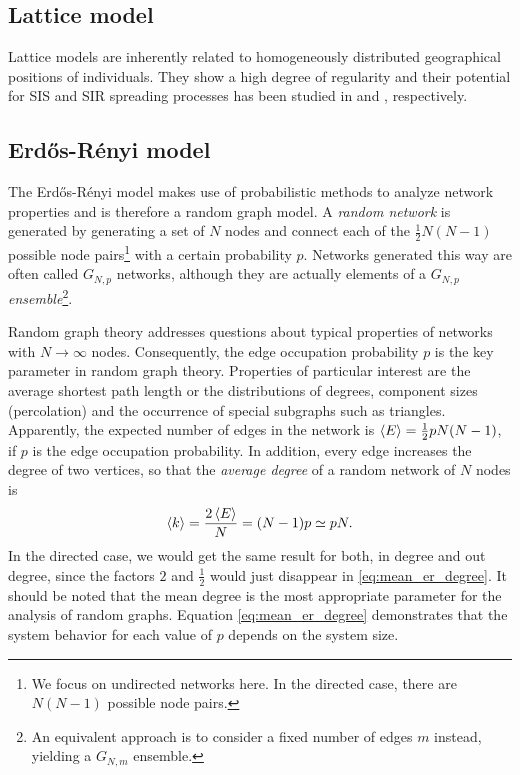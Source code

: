 \documentclass[openright,twoside,headsepline]{scrbook}
\begin{document}
\subsection{Lattice model}
Lattice models are inherently related to homogeneously distributed geographical positions of individuals.
They show a high degree of regularity and their potential for SIS and SIR spreading processes has been studied in \citep{Harris:1974} and \citep{Bak:1990}, respectively.

\subsection{Erd\H{o}s-R\'enyi model}
The Erd\H{o}s-R\'enyi model makes use of probabilistic methods to analyze network properties and is therefore a random graph model.
A \emph{random network} is generated by generating a set of $N$ nodes and connect each of the $\frac{1}{2}N(N-1)$ possible node pairs\footnote{We focus on undirected networks here. In the directed case, there are $N(N-1)$ possible node pairs.} with a certain probability $p$.
Networks generated this way are often called $G_{N,p}$ networks, although they are actually elements of a $G_{N,p}$ \emph{ensemble}\footnote{An equivalent approach is to consider a fixed number of edges $m$ instead, yielding a $G_{N,m}$ ensemble.}.

Random graph theory addresses questions about typical properties of networks with $N\rightarrow \infty $ nodes.
Consequently, the edge occupation probability $p$ is the key parameter in random graph theory.
Properties of particular interest are the average shortest path length or the distributions of degrees, component sizes (percolation) and the occurrence of special subgraphs such as triangles.
Apparently, the expected number of edges in the network is $\left< E \right>=\frac{1}{2}pN(N-1)$, if $p$ is the edge occupation probability.
In addition, every edge increases the degree of two vertices, so that the \emph{average degree} of a random network of $N$ nodes is
\begin{equation}\label{eq:mean_er_degree}
\left< k \right>=\frac{2\left< E \right>}{N}=(N-1)p\simeq pN .
\end{equation}
In the directed case, we would get the same result for both, in degree and out degree, since the factors $2$ and $\frac{1}{2}$ would just disappear in \eqref{eq:mean_er_degree}.
It should be noted that the mean degree is the most appropriate parameter for the analysis of random graphs.
Equation \eqref{eq:mean_er_degree} demonstrates that the system behavior for each value of $p$ depends on the system size.
\end{document}
